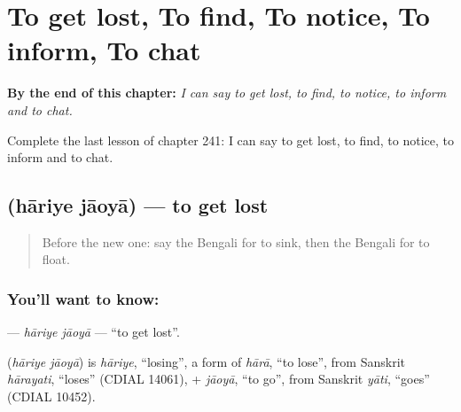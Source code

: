 
\chapter{To get lost, To find, To notice, To inform, To chat}
\label{ch:bn-to-get-lost-to-find-to-notice-to-inform-to-chat}

\begin{chapteropening}
\textbf{By the end of this chapter:} \emph{I can say to get lost, to find, to notice, to inform and to chat.}

Complete the last lesson of chapter 241: I can say to get lost, to find, to notice, to inform and to chat.
\end{chapteropening}

\section[\texorpdfstring{\bn{হারিয়ে} \bn{যাওয়া} (hāriye jāoyā)}{হারিয়ে যাওয়া (hāriye jāoyā)}]{  (hāriye jāoyā) — to get lost}

\label{lesson:BN-C241-hariye-jaoya}



\begin{quote}
Before the new one: say the Bengali for to sink, then the Bengali for to float.
\end{quote}

\subsection*{You'll want to know:  }
\textbf{ } — \emph{hāriye jāoyā} — \textquotedblleft{}to get lost\textquotedblright{}.

\begin{cousinweb}
\textbf{ } (\emph{hāriye jāoyā}) is \emph{hāriye}, \textquotedblleft{}losing\textquotedblright{}, a form of \emph{hārā}, \textquotedblleft{}to lose\textquotedblright{}, from Sanskrit \emph{hārayati}, \textquotedblleft{}loses\textquotedblright{} (CDIAL 14061), + \emph{jāoyā}, \textquotedblleft{}to go\textquotedblright{}, from Sanskrit \emph{yāti}, \textquotedblleft{}goes\textquotedblright{} (CDIAL 10452).
\end{cousinweb}


